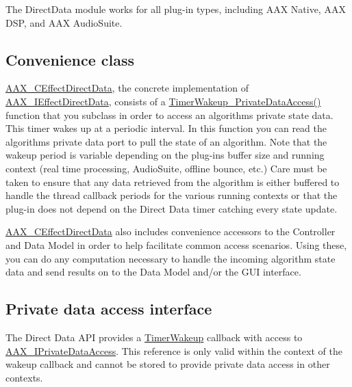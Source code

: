 The Direct\+Data module works for all plug-\/in types, including A\+AX Native, A\+AX D\+SP, and A\+AX Audio\+Suite.\hypertarget{a00803_auxinterface_directdata_convenienceclass}{}\subsection{Convenience class}\label{a00803_auxinterface_directdata_convenienceclass}
\mbox{\hyperlink{a01473}{A\+A\+X\+\_\+\+C\+Effect\+Direct\+Data}}, the concrete implementation of \mbox{\hyperlink{a01817}{A\+A\+X\+\_\+\+I\+Effect\+Direct\+Data}}, consists of a \mbox{\hyperlink{a01473_addd263d3a410d5c26148cee306cc7297}{Timer\+Wakeup\+\_\+\+Private\+Data\+Access()}} function that you subclass in order to access an algorithm\textquotesingle{}s private state data. This timer wakes up at a periodic interval. In this function you can read the algorithm\textquotesingle{}s private data port to pull the state of an algorithm. Note that the wakeup period is variable depending on the plug-\/in\textquotesingle{}s buffer size and running context (real time processing, Audio\+Suite, offline bounce, etc.) Care must be taken to ensure that any data retrieved from the algorithm is either buffered to handle the thread callback periods for the various running contexts or that the plug-\/in does not depend on the Direct Data timer catching every state update.

\mbox{\hyperlink{a01473}{A\+A\+X\+\_\+\+C\+Effect\+Direct\+Data}} also includes convenience accessors to the Controller and Data Model in order to help facilitate common access scenarios. Using these, you can do any computation necessary to handle the incoming algorithm state data and send results on to the Data Model and/or the G\+UI interface.\hypertarget{a00803_auxinterface_directdata_privatedataaccess}{}\subsection{Private data access interface}\label{a00803_auxinterface_directdata_privatedataaccess}
The Direct Data A\+PI provides a \mbox{\hyperlink{a01661_afb4fa2c566547d7bd303166cf50741bb}{Timer\+Wakeup}} callback with access to \mbox{\hyperlink{a01865}{A\+A\+X\+\_\+\+I\+Private\+Data\+Access}}. This reference is only valid within the context of the wakeup callback and cannot be stored to provide private data access in other contexts.

